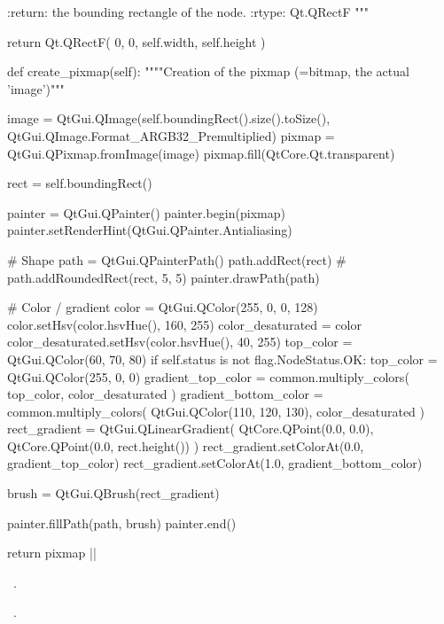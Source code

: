 \documentclass[%
    a4paper,    %
    justified,  %
    nobib,      %
    openany     %
]{tufte-book}
\begin{document}
\begin{fullwidth}
\begin{flushleft}
\begin{minipage}{\linewidth}
\begin{pythoncode}
    :return: the bounding rectangle of the node.
    :rtype: Qt.QRectF
    """

    return Qt.QRectF(
        0, 0, self.width, self.height
    )

def create_pixmap(self):
    """"Creation of the pixmap (=bitmap, the actual 'image')"""

    image = QtGui.QImage(self.boundingRect().size().toSize(),
                         QtGui.QImage.Format_ARGB32_Premultiplied)
    pixmap = QtGui.QPixmap.fromImage(image)
    pixmap.fill(QtCore.Qt.transparent)

    rect = self.boundingRect()

    painter = QtGui.QPainter()
    painter.begin(pixmap)
    painter.setRenderHint(QtGui.QPainter.Antialiasing)

    # Shape
    path = QtGui.QPainterPath()
    path.addRect(rect)
    # path.addRoundedRect(rect, 5, 5)
    painter.drawPath(path)

    # Color / gradient
    color = QtGui.QColor(255, 0, 0, 128)
    color.setHsv(color.hsvHue(), 160, 255)
    color_desaturated = color
    color_desaturated.setHsv(color.hsvHue(), 40, 255)
    top_color = QtGui.QColor(60, 70, 80)
    if self.status is not flag.NodeStatus.OK:
        top_color = QtGui.QColor(255, 0, 0)
    gradient_top_color = common.multiply_colors(
        top_color, color_desaturated
    )
    gradient_bottom_color = common.multiply_colors(
        QtGui.QColor(110, 120, 130), color_desaturated
    )
    rect_gradient = QtGui.QLinearGradient(
        QtCore.QPoint(0.0, 0.0), QtCore.QPoint(0.0, rect.height())
    )
    rect_gradient.setColorAt(0.0, gradient_top_color)
    rect_gradient.setColorAt(1.0, gradient_bottom_color)

    brush = QtGui.QBrush(rect_gradient)

    painter.fillPath(path, brush)
    painter.end()

    return pixmap
|\NWsep|
\end{pythoncode}
\vspace{1.5ex}
\footnotesize
\begin{list}{}{\setlength{\itemsep}{-\parsep}\setlength{\itemindent}{-\leftmargin}}
\item \NWtxtMacroDefBy\ .
\item \NWtxtMacroRefIn\ .


\end{list}
\end{minipage}
\end{flushleft}
\end{fullwidth}
\end{document}
